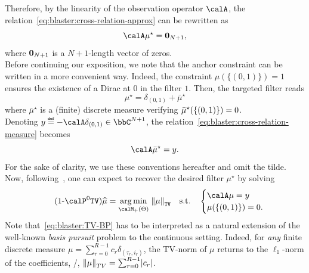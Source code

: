 \mynewline
Therefore, by the linearity of the observation operator $\opObs$, the relation~\cref{eq:blaster:cross-relation-approx} can be rewritten as
\begin{equation}
    \label{eq:blaster:cross-relation-measure}
    \opObs\mu^\star = \zeroVect_{N+1}
    ,
\end{equation}
where $\mathbf{0}_{N+1}$ is a $N+1$-length vector of zeros.
\\Before continuing our exposition, we note that the anchor constraint can be written in a more convenient way.
Indeed, the constraint $\mu(\{(0, 1)\})=1$ ensures the existence of a Dirac at $0$ in the filter $1$.
Then, the targeted filter reads
\begin{equation}
    \mu^\star = \delta_{(0, 1)} + \bar{\mu}^\star
\end{equation}
where $\bar{\mu}^\star$ is a (finite) discrete measure verifying  $\bar{\mu}^\star\kparen{\{(0, 1)\}} = 0$.
\\Denoting $y\eqdef-\opObs\delta_{(0, 1)}\in\bbC^{N+1}$, the relation~\cref{eq:blaster:cross-relation-measure} becomes
\begin{equation}
    \label{eq:blaster:cross-relation-measure-and-obs}
    \opObs\bar{\mu}^\star = y
    .
\end{equation}
For the sake of clarity, we use these conventions hereafter and omit the tilde.
Now, following~, one can expect to recover the desired filter $\mu^\star$ by solving
\begin{equation}
    \stepcounter{equation}
    \tag{\theequation-$\calP^0{\text{\texttt{TV}}}$}
    \label{eq:blaster:TV-BP}
    \widehat{\mu}
    =
    \kargmin_{\posDisRadonMeasure}
    \;
    \normTV{
        \mu
    }
    \quad
    \text{s.t.}
    \quad
    \begin{cases}
        \opObs\mu
        = y \\
        \mu(\{(0, 1)\}) = 0.
    \end{cases}
\end{equation}
Note that~\eqref{eq:blaster:TV-BP} has to be interpreted as a natural extension of the well-known \emph{basis pursuit} problem to the continuous setting.
Indeed, for \emph{any} finite discrete measure $\mu = \sum_{r=0}^{R-1} c_r\delta_{(\tau_r, i_r)}$, the TV-norm of $\mu$ returns to the $\ell_1$-norm of the coefficients, \ie/, $\kvvbar{\mu}_{TV} = \sum_{r=0}^{R-1} \kvbar{c_r}$.

